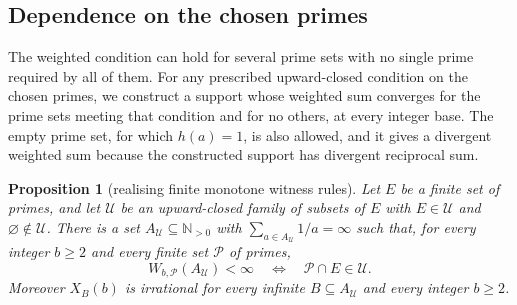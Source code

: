 \documentclass[11pt]{article}
\theoremstyle{plain}
\newtheorem{prop}[thm]{Proposition}
\theoremstyle{definition}
\theoremstyle{remark}
\begin{document}
\subsection{Dependence on the chosen primes}\label{sec:257-finite-witness-rules}
The weighted condition can hold for several prime sets with no single
prime required by all of them. For any prescribed upward-closed condition
on the chosen primes, we construct a support whose weighted sum converges
for the prime sets meeting that condition and for no others, at every
integer base. The empty prime set, for which $h(a)=1$, is also allowed,
and it gives a divergent weighted sum because the constructed support
has divergent reciprocal sum.

\begin{prop}[realising finite monotone witness rules]
\label{prop:257-finite-witness-rule}
Let $E$ be a finite set of primes, and let $\mathcal U$ be an
upward-closed family of subsets of $E$ with $E\in\mathcal U$ and
$\varnothing\notin\mathcal U$.  There is a set
$A_{\mathcal U}\subseteq\mathbb N_{>0}$ with
$\sum_{a\in A_{\mathcal U}}1/a=\infty$ such that, for every integer
$b\ge2$ and every finite set $\mathcal P$ of primes,
\begin{equation}\label{eq:257-finite-witness-rule}
 W_{b,\mathcal P}(A_{\mathcal U})<\infty
 \quad\Longleftrightarrow\quad \mathcal P\cap E\in\mathcal U.
\end{equation}
Moreover $X_B(b)$ is irrational for every infinite
$B\subseteq A_{\mathcal U}$ and every integer $b\ge2$.
\end{prop}
\end{document}
